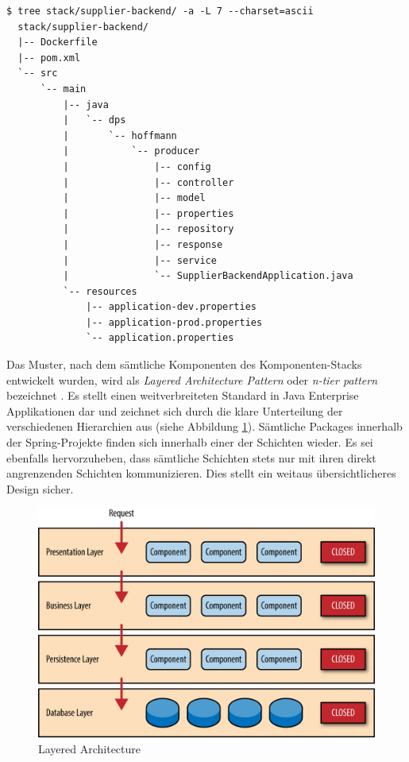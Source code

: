 \label{verb:supplierStruct}
\begin{minipage}{\linewidth}
\begin{lstlisting}[caption={Supplier Backend - Struktur},style=bashStyle]
  $ tree stack/supplier-backend/ -a -L 7 --charset=ascii
  stack/supplier-backend/
  |-- Dockerfile
  |-- pom.xml
  `-- src
      `-- main
          |-- java
          |   `-- dps
          |       `-- hoffmann
          |           `-- producer
          |               |-- config
          |               |-- controller
          |               |-- model
          |               |-- properties
          |               |-- repository
          |               |-- response
          |               |-- service
          |               `-- SupplierBackendApplication.java
          `-- resources
              |-- application-dev.properties
              |-- application-prod.properties
              `-- application.properties
\end{lstlisting}
\end{minipage}

Das Muster, nach dem sämtliche Komponenten des Komponenten-Stacks entwickelt wurden, wird als \emph{Layered Architecture Pattern} oder \emph{n-tier pattern} bezeichnet \cite{oreilly-layered-arch}. Es stellt einen weitverbreiteten Standard in Java Enterprise Applikationen dar und zeichnet sich durch die klare Unterteilung der verschiedenen Hierarchien aus (siehe Abbildung \ref{fig:layeredArchitecture}). Sämtliche Packages innerhalb der Spring-Projekte finden sich innerhalb einer der Schichten wieder. Es sei ebenfalls hervorzuheben, dass sämtliche Schichten stets nur mit ihren direkt angrenzenden Schichten kommunizieren. Dies stellt ein weitaus übersichtlicheres Design sicher.

\begin{figure}[ht!]
	\centering
	\includegraphics[width=.7\linewidth]{kapitel/problemloesung/implementierung/_img/dataflow-overview-01}
	\caption[Layered Architecture]{Layered Architecture \cite{oreilly-layered-arch}}
	\label{fig:layeredArchitecture}
\end{figure}


